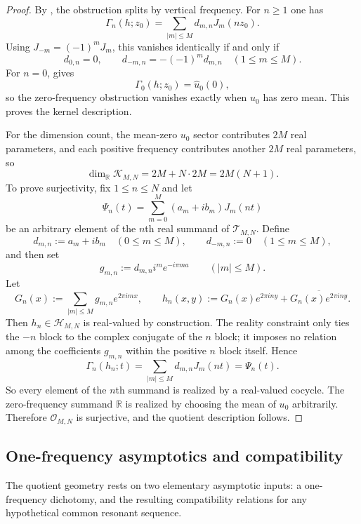 \documentclass[11pt,reqno]{amsart}
\theoremstyle{definition}
\newcommand{\R}{\mathbb{R}}
\newcommand{\e}[1]{e^{2\pi i #1}}
\newcommand{\abs}[1]{\left\lvert #1 \right\rvert}
\begin{document}
\begin{proof}
By , the obstruction splits by vertical
frequency. For $n\ge 1$ one has
\[
\Gamma_n(h;z_0)=\sum_{\abs{m}\le M} d_{m,n} J_m(nz_0).
\]
Using $J_{-m}=(-1)^m J_m$, this vanishes identically if and only if
\[
d_{0,n}=0,
\qquad
d_{-m,n}=-(-1)^m d_{m,n}\quad (1\le m\le M).
\]
For $n=0$,  gives
\[
\Gamma_0(h;z_0)=\widehat u_0(0),
\]
so the zero-frequency obstruction vanishes exactly when $u_0$ has zero mean. This proves the
kernel description.

For the dimension count, the mean-zero $u_0$ sector contributes $2M$ real parameters, and each
positive frequency contributes another $2M$ real parameters, so
\[
\dim_{\R}\mathcal K_{M,N}=2M+N\cdot 2M=2M(N+1).
\]
To prove surjectivity, fix $1\le n\le N$ and let
\[
\Psi_n(t)=\sum_{m=0}^M (a_m+ib_m)J_m(nt)
\]
be an arbitrary element of the $n$th real summand of $\mathcal T_{M,N}$. Define
\[
d_{m,n}:=a_m+ib_m \quad (0\le m\le M),
\qquad
d_{-m,n}:=0 \quad (1\le m\le M),
\]
and then set
\[
g_{m,n}:=d_{m,n} i^m e^{-i\pi m a}
\qquad (\abs{m}\le M).
\]
Let
\[
G_n(x):=\sum_{\abs{m}\le M} g_{m,n}\e{mx},
\qquad
h_n(x,y):=G_n(x)\e{ny}+\overline{G_n(x)\e{ny}}.
\]
Then $h_n\in\mathcal H_{M,N}$ is real-valued by construction. The reality constraint only ties
the $-n$ block to the complex conjugate of the $n$ block; it imposes no relation among the
coefficients $g_{m,n}$ within the positive $n$ block itself. Hence
\[
\Gamma_n(h_n;t)=\sum_{\abs{m}\le M} d_{m,n}J_m(nt)=\Psi_n(t).
\]
So every element of the $n$th summand is realized by a real-valued cocycle. The zero-frequency
summand $\R$ is realized by choosing the mean of $u_0$ arbitrarily. Therefore
$\mathcal O_{M,N}$ is surjective, and the quotient description follows.
\end{proof}

\subsection*{One-frequency asymptotics and compatibility}

The quotient geometry rests on two elementary asymptotic inputs: a one-frequency dichotomy, and
the resulting compatibility relations for any hypothetical common resonant sequence.
\end{document}
